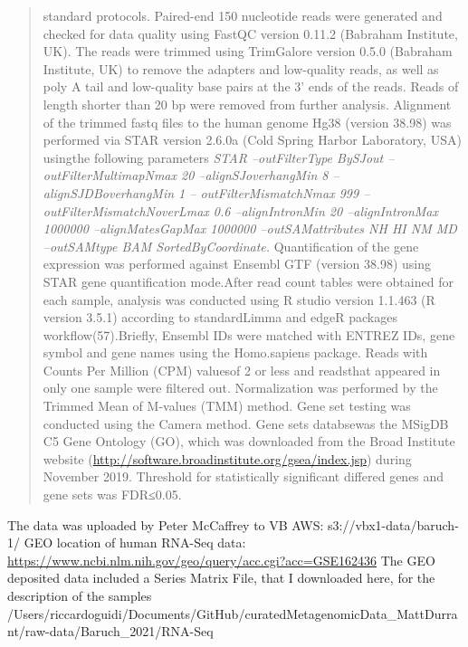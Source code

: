 \documentclass[
]{article}
\begin{document}
\begin{quote}
standard protocols. Paired-end 150 nucleotide reads were generated and
checked for data quality using FastQC version 0.11.2 (Babraham
Institute, UK). The reads were trimmed using TrimGalore version 0.5.0
(Babraham Institute, UK) to remove the adapters and low-quality reads,
as well as poly A tail and low-quality base pairs at the 3' ends of the
reads. Reads of length shorter than 20 bp were removed from further
analysis. Alignment of the trimmed fastq files to the human genome Hg38
(version 38.98) was performed via STAR version 2.6.0a (Cold Spring
Harbor Laboratory, USA) usingthe following parameters \emph{STAR
--outFilterType BySJout --outFilterMultimapNmax 20 --alignSJoverhangMin
8 --alignSJDBoverhangMin 1 -- outFilterMismatchNmax 999
--outFilterMismatchNoverLmax 0.6 --alignIntronMin 20 --alignIntronMax
1000000 --alignMatesGapMax 1000000 --outSAMattributes NH HI NM MD
--outSAMtype BAM SortedByCoordinate.} Quantification of the gene
expression was performed against Ensembl GTF (version 38.98) using STAR
gene quantification mode.After read count tables were obtained for each
sample, analysis was conducted using R studio version 1.1.463 (R version
3.5.1) according to standardLimma and edgeR packages
workflow(57).Briefly, Ensembl IDs were matched with ENTREZ IDs, gene
symbol and gene names using the Homo.sapiens package. Reads with Counts
Per Million (CPM) valuesof 2 or less and readsthat appeared in only one
sample were filtered out. Normalization was performed by the Trimmed
Mean of M-values (TMM) method. Gene set testing was conducted using the
Camera method. Gene sets databsewas the MSigDB C5 Gene Ontology (GO),
which was downloaded from the Broad Institute website
(\url{http://software.broadinstitute.org/gsea/index.jsp}) during
November 2019. Threshold for statistically significant differed genes
and gene sets was FDR≤0.05.
\end{quote}

The data was uploaded by Peter McCaffrey to VB AWS:
s3://vbx1-data/baruch-1/ GEO location of human RNA-Seq data:
\url{https://www.ncbi.nlm.nih.gov/geo/query/acc.cgi?acc=GSE162436} The
GEO deposited data included a Series Matrix File, that I downloaded
here, for the description of the samples
/Users/riccardoguidi/Documents/GitHub/curatedMetagenomicData\_MattDurrant/raw-data/Baruch\_2021/RNA-Seq
\end{document}
